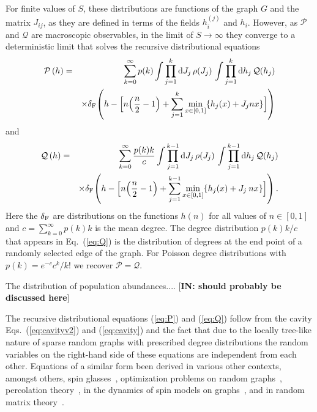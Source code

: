 \documentclass[11pt,a4paper]{article}
\begin{document}
For finite values of $S$, these distributions are functions of the graph $G$ and the matrix $J_{ij}$, as they are defined in terms of the fields $h^{(j)}_i$ and $h_i$.    However, as $\mathcal{P}$ and $\mathcal{Q}$ are macroscopic observables, in the limit of $S\rightarrow \infty$ they converge to a deterministic limit that solves  the
 recursive distributional equations 
\begin{eqnarray}
    \mathcal{P}\left( h \right)
    &=& \sum_{k=0}^{\infty} p(k)
    \int \prod_{j=1}^k \mathrm{d}J_j\,\rho(J_j)\,
    \int \prod_{j=1}^k \mathrm{d}h_j\,\mathcal{Q}(h_j)
    \nonumber\\
    &&\times \delta_{{\rm F}}\!\left(
      h - \Big[ n\!\left(\frac{n}{2}-1\right)
      + \sum_{j=1}^k \min_{x\in[0,1]}\{h_j(x)+J_j n x\}\Big]
    \right) \label{eq:P}
\end{eqnarray} 
and
\begin{eqnarray}
    \mathcal{Q}\left( h \right)
    &=& \sum_{k=0}^{\infty} \frac{p(k)k}{c}
    \int \prod_{j=1}^{k-1} \mathrm{d}J_j\,\rho(J_j)\,
    \int \prod_{j=1}^{k-1} \mathrm{d}h_j\,\mathcal{Q}(h_j)
    \nonumber\\
    &&\times \delta_{{\rm F}}\!\left(
      h - \Big[ n\!\left(\frac{n}{2}-1\right)
      + \sum_{j=1}^{k-1} \min_{x\in[0,1]}\{h_j(x)+J_j \:  n x\}\Big]
    \right). \label{eq:Q}
\end{eqnarray} 
Here the $\delta_{{\rm F}}$ are  distributions on the functions  $h(n)$ for all values of $n\in[0,1]$ and $c= \sum^{\infty}_{k=0}p(k)k$ is the mean degree.    The degree distribution  $p(k)k/c$  that appears in Eq.~(\ref{eq:Q}) is the distribution of degrees at the end point of a randomly selected edge of the graph. 
For Poisson degree distributions with $p(k) = e^{-c}c^k/k!$ we recover $\mathcal{P} = \mathcal{Q}$.     


The distribution of population abundances.... [{\bf IN: should probably be discussed here}]

        The recursive distributional equations (\ref{eq:P}) and (\ref{eq:Q})  follow from   the  cavity Eqs.~(\ref{eq:cavityv2}) and (\ref{eq:cavity})  and the fact that due to the locally tree-like nature of sparse random graphs with prescribed degree distributions the random variables on the right-hand side of these equations   are independent from each other.   Equations of a similar form  been derived in various other contexts,  amongst others,  spin glasses~\cite{viana1985phase,skantzos},  optimization problems on random graphs~\cite{zdeborova2007phase},  percolation theory~\cite{kuhn2017heterogeneous}, in the dynamics of spin models on graphs~\cite{neri2009cavity},  and  in random matrix theory~\cite{kuhn2008spectra,bordenave2010resolvent,mambuca2022dynamical}. 
\end{document}
